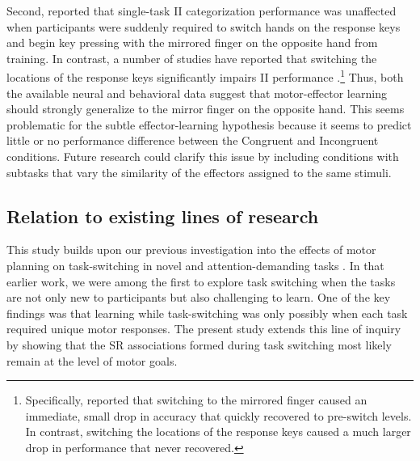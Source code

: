\documentclass[doc, floatsintext]{apa7}
\begin{document}
Second, \textcite{ashby_procedural_2003} reported that single-task II categorization performance was unaffected when participants were suddenly required to switch hands on the response keys and begin key pressing with the mirrored finger on the opposite hand from training. In contrast, a number of studies have reported that switching the locations of the response keys significantly impairs II performance \parencite{ashby_procedural_2003, CrossleyEtAl2012, MaddoxBohilIng2004, MaddoxEtAl2007, SpieringAshby2008}.\footnote{Specifically, \textcite{ashby_procedural_2003} reported that switching to the mirrored finger caused an immediate, small drop in accuracy that quickly recovered to pre-switch levels. In contrast, switching the locations of the response keys caused a much larger drop in performance that never recovered.} Thus, both the available neural and behavioral data suggest that motor-effector learning should strongly generalize to the mirror finger on the opposite hand. This seems problematic for the subtle effector-learning hypothesis because it seems to predict little or no performance difference between the Congruent and Incongruent conditions. Future research could clarify this issue by including conditions with subtasks that vary the similarity of the effectors assigned to the same stimuli.

% 
% 
% 

\subsection{Relation to existing lines of research}
This study builds upon our previous investigation into the
effects of motor planning on task-switching in novel and
attention-demanding tasks \parencite{crossley_switch_2023,
crossley_trial-by-trial_2018, turner_hierarchical_2017}.  In
that earlier work, we were among the first to explore task
switching when the tasks are not only new to participants
but also challenging to learn.  One of the key findings was
that learning while task-switching was only possibly when
each task required unique motor responses.  The present study extends this line of inquiry by showing that the SR associations formed during task switching most likely remain at the level of motor goals. 
\end{document}
